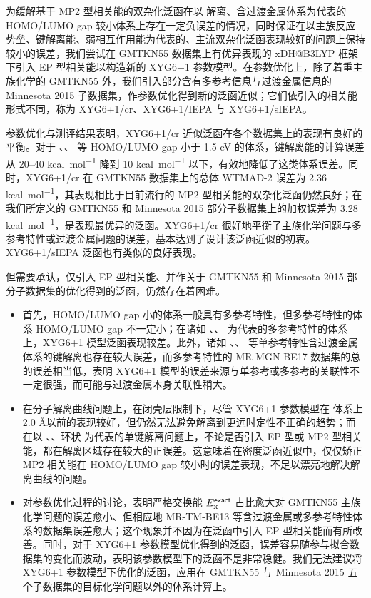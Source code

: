 为缓解基于 MP2 型相关能的双杂化泛函在以  解离、含过渡金属体系为代表的 HOMO/LUMO gap 较小体系上存在一定负误差的情况，同时保证在以主族反应势垒、键解离能、弱相互作用能为代表的、主流双杂化泛函表现较好的问题上保持较小的误差，我们尝试在 GMTKN55 数据集上有优异表现的 xDH@B3LYP 框架下引入 EP 型相关能以构造新的 XYG6+1 参数模型。在参数优化上，除了着重主族化学的 GMTKN55 外，我们引入部分含有多参考信息与过渡金属信息的 Minnesota 2015 子数据集，作参数优化得到新的泛函近似；它们依引入的相关能形式不同，称为 XYG6+1/cr、XYG6+1/IEPA 与 XYG6+1/sIEPA。

参数优化与测评结果表明，XYG6+1/cr 近似泛函在各个数据集上的表现有良好的平衡。对于 、、 等 HOMO/LUMO gap 小于 1.5 eV 的体系，键解离能的计算误差从 20--40 \si{kcal.mol^{-1}} 降到 10 \si{kcal.mol^{-1}} 以下，有效地降低了这类体系误差。同时，XYG6+1/cr 在 GMTKN55 数据集上的总体 WTMAD-2 误差为 2.36 \si{kcal.mol^{-1}}，其表现相比于目前流行的 MP2 型相关能的双杂化泛函仍然良好；在我们所定义的 GMTKN55 和 Minnesota 2015 部分子数据集上的加权误差为 3.28 \si{kcal.mol^{-1}}，是表现最优异的泛函。XYG6+1/cr 很好地平衡了主族化学问题与多参考特性或过渡金属问题的误差，基本达到了设计该泛函近似的初衷。XYG6+1/sIEPA 泛函也有类似的良好表现。

但需要承认，仅引入 EP 型相关能、并作关于 GMTKN55 和 Minnesota 2015 部分子数据集的优化得到的泛函，仍然存在着困难。
\begin{itemize}[nosep]
  \item 首先，HOMO/LUMO gap 小的体系一般具有多参考特性，但多参考特性的体系 HOMO/LUMO gap 不一定小；在诸如 、、 为代表的多参考特性的体系上，XYG6+1 模型泛函表现较差。此外，诸如 、、 等单参考特性含过渡金属体系的键解离也存在较大误差，而多参考特性的 MR-MGN-BE17 数据集的总的误差相当低，表明 XYG6+1 模型的误差来源与单参考或多参考的关联性不一定很强，而可能与过渡金属本身关联性稍大。
  \item 在分子解离曲线问题上，在闭壳层限制下，尽管 XYG6+1 参数模型在  体系上 2.0 \AA 以前的表现较好，但仍然无法避免解离到更远时定性不正确的趋势；而在以 、、环状  为代表的单键解离问题上，不论是否引入 EP 型或 MP2 型相关能，都在解离区域存在较大的正误差。这意味着在密度泛函近似中，仅仅矫正 MP2 相关能在 HOMO/LUMO gap 较小时的误差表现，不足以漂亮地解决解离曲线的问题。
  \item 对参数优化过程的讨论，表明严格交换能 $E_\mathrm{x}^{\textsf{exact}}$ 占比愈大对 GMTKN55 主族化学问题的误差愈小、但相应地 MR-TM-BE13 等含过渡金属或多参考特性体系的数据集误差愈大；这个现象并不因为在泛函中引入 EP 型相关能而有所改善。同时，对于 XYG6+1 参数模型优化得到的泛函，误差容易随参与拟合数据集的变化而波动，表明该参数模型下的泛函不是非常稳健。我们无法建议将 XYG6+1 参数模型下优化的泛函，应用在 GMTKN55 与 Minnesota 2015 五个子数据集的目标化学问题以外的体系计算上。
\end{itemize}

